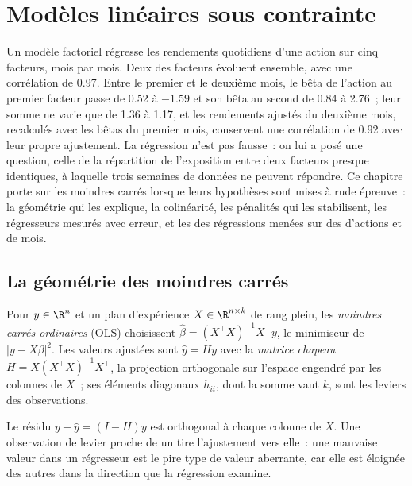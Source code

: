 \chapter{Modèles linéaires sous contrainte}\label{ch:qm:linear-models-under-stress}

Un modèle factoriel régresse les rendements quotidiens d'une action sur cinq facteurs, mois par mois. Deux des facteurs évoluent
ensemble, avec une corrélation de 0.97. Entre le premier et le deuxième mois, le bêta de l'action au premier facteur passe de 0.52 à $-1.59$ et son
bêta au second de 0.84 à 2.76~; leur somme ne varie que de 1.36 à 1.17, et les rendements ajustés du deuxième mois, recalculés
avec les bêtas du premier mois, conservent une corrélation de 0.92 avec leur propre ajustement. La régression n'est pas fausse~: on lui a
posé une question, celle de la répartition de l'exposition entre deux facteurs presque identiques, à laquelle trois semaines de données ne peuvent répondre. Ce chapitre porte
sur les moindres carrés lorsque leurs hypothèses sont mises à rude épreuve~: la géométrie qui les explique, la colinéarité, les pénalités qui les stabilisent,
les régresseurs mesurés avec erreur, et les  des régressions menées sur des  d'actions et de mois.

\section{La géométrie des moindres carrés}

\begin{definition}\label{def:qm:linear-models-under-stress:ols}
Pour $y \in \R^n$ et un plan d'expérience $X \in \R^{n \times k}$ de rang plein, les \emph{moindres carrés ordinaires} (OLS) choisissent
$\hat\beta = (X^\top X)^{-1}X^\top y$, le minimiseur de $\lvert y - X\beta\rvert^2$. Les valeurs ajustées sont $\hat y = Hy$ avec la \emph{matrice
chapeau} $H = X(X^\top X)^{-1}X^\top$, la projection orthogonale sur l'espace engendré par les colonnes de $X$~; ses éléments diagonaux
$h_{ii}$, dont la somme vaut $k$, sont les leviers des observations.
\end{definition}

Le résidu $y - \hat y = (I - H)y$ est orthogonal à chaque colonne de $X$. Une observation de levier proche de un tire l'ajustement
vers elle~: une mauvaise valeur dans un régresseur est le pire type de valeur aberrante, car elle est éloignée des autres dans la direction
que la régression examine.

